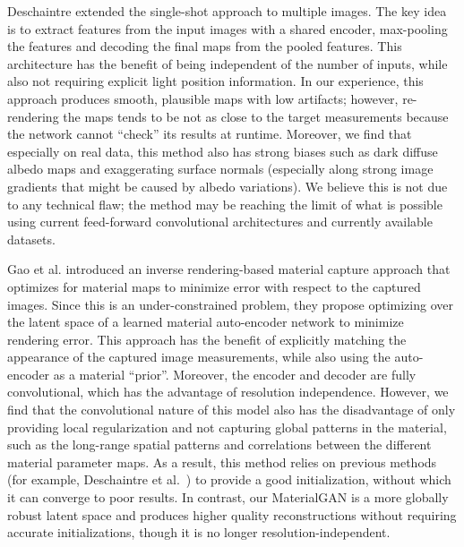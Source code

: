 Deschaintre  extended the single-shot approach to multiple images. The key idea is to extract features from the input images with a shared encoder, max-pooling the features and decoding the final maps from the pooled features. This architecture has the benefit of being independent of the number of inputs, while also not requiring explicit light position information. In our experience, this approach produces smooth, plausible maps with low artifacts; however, re-rendering the maps tends to be not as close to the target measurements because the network cannot ``check'' its results at runtime. Moreover, we find that especially on real data, this method also has strong biases such as dark diffuse albedo maps and exaggerating surface normals (especially along strong image gradients that might be caused by albedo variations). We believe this is not due to any technical flaw; the method may be reaching the limit of what is possible using current feed-forward convolutional architectures and currently available datasets.

Gao et al.  introduced an inverse rendering-based material capture approach that optimizes for material maps to minimize error with respect to the captured images. Since this is an under-constrained problem, they propose optimizing over the latent space of a learned material auto-encoder network to minimize rendering error. This approach has the benefit of explicitly matching the appearance of the captured image measurements, while also using the auto-encoder as a material ``prior''. Moreover, the encoder and decoder are fully convolutional, which has the advantage of resolution independence.
However, we find that the convolutional nature of this model also has the disadvantage of only providing local regularization and not capturing global patterns in the material, such as the long-range spatial patterns and correlations between the different material parameter maps. As a result, this method relies on previous methods (for example, Deschaintre et al.~) to provide a good initialization, without which it can converge to poor results.
In contrast, our MaterialGAN is a more globally robust latent space and produces higher quality reconstructions without requiring accurate initializations, though it is no longer resolution-independent.


